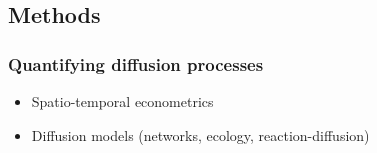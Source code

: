 \subsection{Methods}

\subsubsection{Quantifying diffusion processes}

\begin{itemize}
	\item Spatio-temporal econometrics
	\item Diffusion models (networks, ecology, reaction-diffusion)
\end{itemize}















